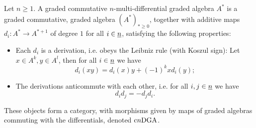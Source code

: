 \begin{defn}\label{def_cmdga}
Let $n \geq 1$. A graded commutative $n$-multi-differential graded algebra $A^*$ is a graded commutative, graded algebra $(A^*)_{* \geq 0}$, together with additive maps $d_i: A^* \to A^{*+1}$ of degree $1$ for all $i \in \underline{n}$, satisfying the following properties:
\begin{itemize}
\item Each $d_i$ is a derivation, i.e. obeys the Leibniz rule (with Koszul sign): Let $x \in A^k, y \in A^l$, then for all $i \in \underline{n}$ we have%
$$d_i (xy) = d_i(x)y + (-1)^{k}xd_i(y);$$
\item The derivations anticommute with each other, i.e. for all $i,j \in \underline{n}$ we have%
$$d_i d_j = - d_j d_i.$$
\end{itemize}
These objects form a category, with morphisms given by maps of graded algebras commuting with the differentials, denoted $\mathrm{c}n\mathrm{DGA}$.
\end{defn}
%
%
